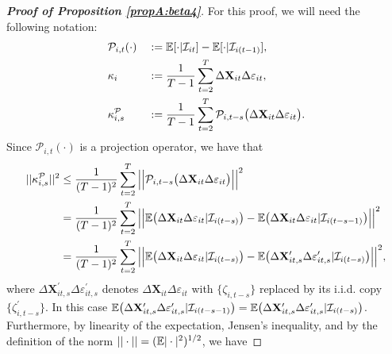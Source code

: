 \begin{proof}[\textnormal{\textbf{Proof of Proposition \ref{propA:beta4}}}]
For this proof, we will need the following notation:
\begin{alignat*}{2}
&\mathcal{P}_{i,t}(\cdot) &&:= \mathbb{E}[\cdot|\mathcal{I}_{it}] -\mathbb{E}[\cdot|\mathcal{I}_{i(t-1)}], \\
&\kappa_{i} && := \frac{1}{T-1}\sum_{t=2}^T  \Delta \mathbf{X}_{it}\Delta \varepsilon_{it}, \\
&\kappa_{i, s}^{\mathcal{P}} && := \frac{1}{T-1}\sum_{t=2}^T \mathcal{P}_{i, t-s}\big( \Delta \mathbf{X}_{it}\Delta \varepsilon_{it}\big).
\end{alignat*}
Since $\mathcal{P}_{i, t}(\cdot)$ is a projection operator, we have that 
\begin{align*}
||\kappa_{i, s}^{\mathcal{P}}||^2 %
&\leq \frac{1}{(T-1)^2} \sum_{t=2}^T \Big|\Big| \mathcal{P}_{i, t-s}\big( \Delta \mathbf{X}_{it}\Delta \varepsilon_{it}\big) \Big|\Big|^2\\
&= \frac{1}{(T-1)^2} \sum_{t=2}^T \Big|\Big| \ex \big(\Delta \mathbf{X}_{it}\Delta \varepsilon_{it}|\mathcal{I}_{i(t-s)}\big) -\ex \big(\Delta \mathbf{X}_{it}\Delta \varepsilon_{it}|\mathcal{I}_{i(t-s-1)}\big) \Big|\Big|^2\\
&= \frac{1}{(T-1)^2} \sum_{t=2}^T \Big|\Big| \ex \big(\Delta \mathbf{X}_{it}\Delta \varepsilon_{it}|\mathcal{I}_{i(t-s)}\big) -\ex \big(\Delta \mathbf{X}_{it, s}^\prime\Delta \varepsilon_{it, s}^\prime|\mathcal{I}_{i(t-s)}\big) \Big|\Big|^2,
\end{align*}
where $\Delta \mathbf{X}_{it, s}^\prime\Delta \varepsilon_{it, s}^\prime$ denotes $\Delta \mathbf{X}_{it}\Delta \varepsilon_{it}$ with $\{\zeta_{i, t-s}\}$ replaced by its i.i.d. copy $\{\zeta_{i, t-s}^\prime\}$. In this case $\mathbb{E} \big(\Delta \mathbf{X}_{it, s}^\prime\Delta \varepsilon_{it, s}^\prime|\mathcal{I}_{i(t-s -1)}\big) = \mathbb{E} \big(\Delta \mathbf{X}_{it, s}^\prime\Delta \varepsilon_{it, s}^\prime|\mathcal{I}_{i(t-s)}\big)$. Furthermore, by linearity of the expectation, Jensen's inequality, {\color{red} and by the definition of the norm \linebreak $||\cdot|| = (\mathbb{E}|\cdot|^2)^{1/2}$}, we have 

\end{proof}
